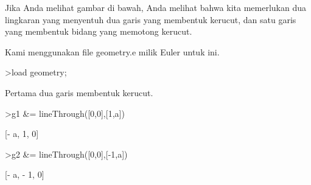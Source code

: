 \documentclass[a4paper,10pt]{article}
\begin{document}
\begin{eulernotebook}
\begin{eulercomment}
\begin{eulercomment}
\begin{eulercomment}
\begin{eulercomment}
\begin{eulercomment}
\begin{eulercomment}
\begin{eulercomment}
\begin{eulercomment}
\begin{eulercomment}
\begin{eulercomment}
\begin{eulercomment}
\begin{eulercomment}
\begin{eulercomment}
\begin{eulercomment}
\begin{eulercomment}
\begin{eulercomment}
\begin{eulercomment}
\begin{eulercomment}
\begin{eulercomment}
\begin{eulercomment}
\begin{eulercomment}
\begin{eulercomment}
\begin{eulercomment}
\begin{eulercomment}
\begin{eulercomment}
\begin{eulercomment}
\begin{eulercomment}
\begin{eulercomment}
\begin{eulercomment}
\begin{eulercomment}
\begin{eulercomment}
\begin{eulercomment}
\begin{eulercomment}
\begin{eulercomment}
\begin{eulercomment}
\begin{eulercomment}
\begin{eulercomment}
\begin{eulercomment}
\begin{eulercomment}
\begin{eulercomment}
\begin{eulercomment}
\begin{eulercomment}
\begin{eulercomment}
Jika Anda melihat gambar di bawah, Anda melihat bahwa kita memerlukan
dua lingkaran yang menyentuh dua garis yang membentuk kerucut, dan
satu garis yang membentuk bidang yang memotong kerucut.

Kami menggunakan file geometry.e milik Euler untuk ini.
\end{eulercomment}
\begin{eulerprompt}
>load geometry;
\end{eulerprompt}
\begin{eulercomment}
Pertama dua garis membentuk kerucut.
\end{eulercomment}
\begin{eulerprompt}
>g1 &= lineThrough([0,0],[1,a])
\end{eulerprompt}
\begin{euleroutput}
  
                               [- a, 1, 0]
  
\end{euleroutput}
\begin{eulerprompt}
>g2 &= lineThrough([0,0],[-1,a])
\end{eulerprompt}
\begin{euleroutput}
  
                              [- a, - 1, 0]
  

\end{euleroutput}
\end{eulercomment}
\end{eulercomment}
\end{eulercomment}
\end{eulercomment}
\end{eulercomment}
\end{eulercomment}
\end{eulercomment}
\end{eulercomment}
\end{eulercomment}
\end{eulercomment}
\end{eulercomment}
\end{eulercomment}
\end{eulercomment}
\end{eulercomment}
\end{eulercomment}
\end{eulercomment}
\end{eulercomment}
\end{eulercomment}
\end{eulercomment}
\end{eulercomment}
\end{eulercomment}
\end{eulercomment}
\end{eulercomment}
\end{eulercomment}
\end{eulercomment}
\end{eulercomment}
\end{eulercomment}
\end{eulercomment}
\end{eulercomment}
\end{eulercomment}
\end{eulercomment}
\end{eulercomment}
\end{eulercomment}
\end{eulercomment}
\end{eulercomment}
\end{eulercomment}
\end{eulercomment}
\end{eulercomment}
\end{eulercomment}
\end{eulercomment}
\end{eulercomment}
\end{eulercomment}
\end{eulernotebook}
\end{document}
